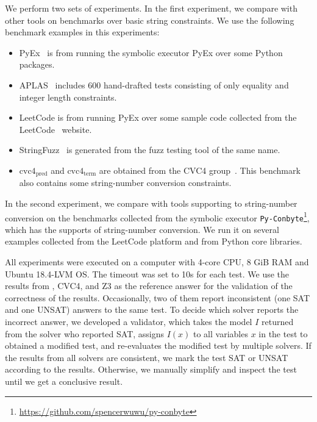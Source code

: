 We perform two sets of experiments. In the first experiment, we compare with other tools on benchmarks over basic string constraints. We use the following benchmark examples in this experiments:
\begin{itemize}
	\item PyEx~\cite{pyex} is from running the symbolic executor PyEx over some Python packages.
	\item APLAS~\cite{aplas} includes 600 hand-drafted tests consisting of only equality and integer length constraints.
	\item LeetCode is from running PyEx over some sample code collected from the LeetCode~\cite{LeetCode} website.
	\item StringFuzz~\cite{StringFuzz}  is generated from the fuzz testing tool of the same name.
	\item $\text{cvc4}_{\text{pred}}$ and $\text{cvc4}_{\text{term}}$ are obtained from the CVC4 group~\cite{termEQ}. This benchmark also contains some string-number conversion constraints.
\end{itemize}

In the second experiment, we compare with tools supporting to string-number conversion on the  benchmarks collected from the symbolic executor \texttt{Py-Conbyte}\footnote{\url{https://github.com/spencerwuwu/py-conbyte}}, which has the supports of string-number conversion. We run it on several examples collected from the LeetCode platform and from Python core libraries.

All experiments were executed on a computer with 4-core CPU, 8 GiB RAM and Ubuntu 18.4-LVM OS. The timeout was set to 10s for each test.
We use the results from {\tool}, CVC4, and Z3 as the reference answer for the validation of the correctness of the results. Occasionally, two of them report inconsistent (one SAT and one UNSAT) answers to the same test. To decide which solver reports the incorrect answer, we developed a validator, which takes the model $I$ returned from the solver who reported SAT, assigns $I(x)$ to all variables $x$ in the test to obtained a modified test, and re-evaluates the modified test by multiple solvers. If the results from all solvers are consistent, we mark the test SAT or UNSAT according to the results. Otherwise, we manually simplify and inspect the test until we get a conclusive result. 

